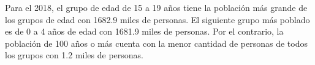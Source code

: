 Para el 2018, el grupo de edad de 15 a 19 años tiene la población más grande de los grupos de edad con 1682.9 miles de personas. El siguiente grupo más poblado es de 0 a 4 años de edad con 1681.9 miles de personas. Por el contrario,  la población de 100 años o más cuenta con la menor cantidad de personas de todos los grupos con 1.2 miles de personas. 